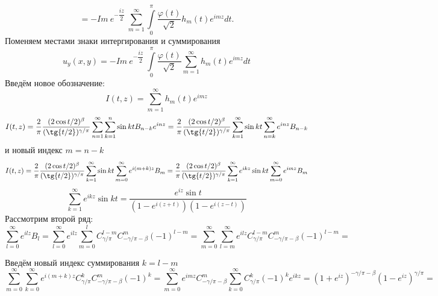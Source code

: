\documentclass[a4paper, 9pt]{article}
\begin{document}
		\begin{equation*}
			 = -  Im \ e^{-\dfrac{iz}{2}}\ \sum\limits_{m=1}^{\infty}  \int\limits_0^\pi \dfrac{\varphi(t)}{\sqrt2}  h_{m}(t)  e^{im z}  dt .
		\end{equation*}
		Поменяем местами знаки интергирования и суммирования
		\begin{equation*}
			u_y(x,y)  = -  Im \ e^{-\dfrac{iz}{2}}\  \int\limits_0^\pi \dfrac{\varphi(t)}{\sqrt2}  \sum\limits_{m=1}^{\infty}   h_{m}(t)  e^{im z}  dt
		\end{equation*}
		Введём новое обозначение:
		\begin{equation*}
			I(t,z) = \sum\limits_{m=1}^{\infty}  h_{m}(t)  e^{im z}
		\end{equation*}
		\begin{equation*}
			I(t,z) =\dfrac{2}{\pi}\dfrac{(2\cos{t/2})^\beta}{(\tg{t/2})^{\gamma/\pi}} \sum\limits_{n=1}^{\infty}   \sum\limits_{k=1}^n \sin{kt} B_{n-k} e^{inz} = 
			\dfrac{2}{\pi}\dfrac{(2\cos{t/2})^\beta}{(\tg{t/2})^{\gamma/\pi}} \sum\limits_{k=1}^{\infty} \sin{kt} \sum\limits_{n=k}^{\infty} e^{inz} B_{n-k}
		\end{equation*}
		и новый индекс $m = n - k$
		\begin{equation*}
			I(t,z) = \dfrac{2}{\pi}\dfrac{(2\cos{t/2})^\beta}{(\tg{t/2})^{\gamma/\pi}} \sum\limits_{k=1}^{\infty} \sin{kt} \sum\limits_{m =0 }^{\infty} e^{i(m+k)z} B_{m} = 
			\dfrac{2}{\pi}\dfrac{(2\cos{t/2})^\beta}{(\tg{t/2})^{\gamma/\pi}} \sum\limits_{k=1}^{\infty} e^{ikz}\sin{kt} \sum\limits_{m =0 }^{\infty} e^{imz} B_{m}
		\end{equation*}
		\begin{equation*}
			\sum\limits_{k=1}^{\infty} e^{ikz}\sin{kt} =  \dfrac{e^{iz} \sin{t}}{\left(1 - e^{i(z+t)} \right) \left(1 - e^{i(z-t)}\right)}
		\end{equation*}
		Рассмотрим второй ряд:
		\begin{equation*}
			\sum\limits_{l =0 }^{\infty} e^{ilz} B_{l} = \sum\limits_{l =0 }^{\infty} e^{ilz} \sum\limits_{m=0}^{l} C^{l - m}_{\gamma/\pi} C^{m}_{-\gamma/\pi - \beta} (-1)^{l-m} = \sum\limits_{m=0}^{\infty} \sum\limits_{l=m}^{\infty} e^{ilz} C^{l - m}_{\gamma/\pi} C^{m}_{-\gamma/\pi - \beta} (-1)^{l-m} = 
		\end{equation*}
		\par
		Введём новый индекс суммирования $k = l -m$
		\begin{equation*}
			\sum\limits_{m=0}^{\infty} \sum\limits_{k=0}^{\infty} e^{i(m+k)z} C^{k}_{\gamma/\pi} C^{m}_{-\gamma/\pi - \beta} (-1)^{k} = \sum\limits_{m=0}^{\infty} e^{imz} C^{m}_{-\gamma/\pi - \beta} \sum\limits_{k=0}^{\infty}  C^{k}_{\gamma/\pi} (-1)^k e^{ikz} = (1 + e^{iz})^{-\gamma/\pi - \beta} (1- e^{iz})^{\gamma/\pi} =
		\end{equation*}
\end{document}
